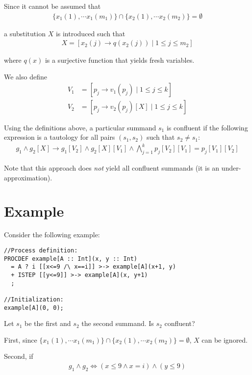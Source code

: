 Since it cannot be assumed that
\begin{align*}
\{ x_1(1), \cdots{} x_1(m_1) \} \cap \{ x_2(1), \cdots{} x_2(m_2) \} = \emptyset{}
\end{align*}

a substitution $X$ is introduced such that
\begin{align*}
X = [ x_2(j) \rightarrow q(x_2(j)) \;|\; 1 \leq j \leq m_2 ]
\end{align*}

where $q(x)$ is a surjective function that yields fresh variables.

We also define
\begin{align*}
V_{1} &= [p_j \rightarrow v_1(p_j) \;|\; 1 \leq j \leq k] \\
V_{2} &= [p_j \rightarrow v_2(p_j)[X] \;|\; 1 \leq j \leq k]
\end{align*}

Using the definitions above, a particular \istep{} summand $s_1$ is confluent if the following expression is a tautology for all pairs $(s_1, s_2)$ such that $s_2 \neq s_1$:
\begin{align*}
g_1 \land g_2[X] \rightarrow g_1[V_2] \land g_2[X][V_1] \land \bigwedge\limits_{j=1}^{k} p_j[V_2][V_1] = p_j[V_1][V_2]
\end{align*}

Note that this approach does \emph{not} yield all confluent \istep{} summands (it is an under-approximation).

\section{Example}

Consider the following example:

\begin{lstlisting}
//Process definition:
PROCDEF example[A :: Int](x, y :: Int)
  = A ? i [[x<=9 /\ x==i]] >-> example[A](x+1, y)
  + ISTEP [[y<=9]] >-> example[A](x, y+1)
  ;

//Initialization:
example[A](0, 0);
\end{lstlisting}

Let $s_1$ be the first and $s_2$ the second summand.
Is $s_2$ confluent?

First, since $\{ x_1(1), \cdots{} x_1(m_1) \} \cap \{ x_2(1), \cdots{} x_2(m_2) \} = \emptyset{}$, $X$ can be ignored.

Second, if
\begin{align*}
g_1 \land g_2 \Leftrightarrow (x \leq 9 \land x=i) \land (y \leq 9)
\end{align*}

